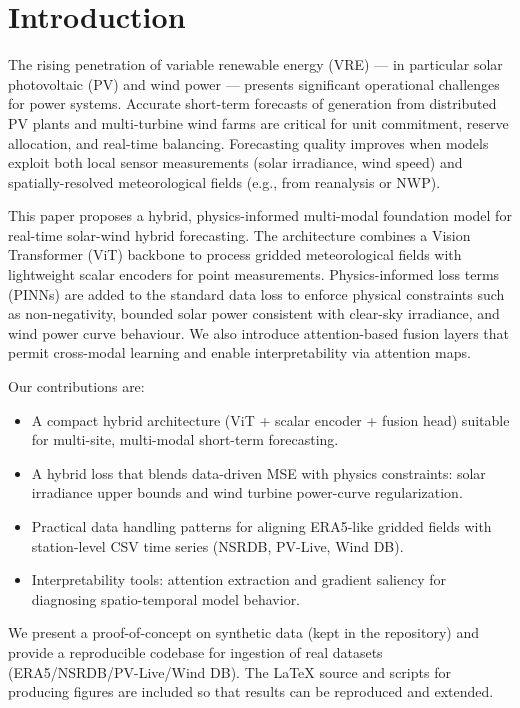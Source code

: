 \section*{Introduction}

The rising penetration of variable renewable energy (VRE) — in particular solar photovoltaic (PV) and wind power — presents significant operational challenges for power systems. Accurate short-term forecasts of generation from distributed PV plants and multi-turbine wind farms are critical for unit commitment, reserve allocation, and real-time balancing. Forecasting quality improves when models exploit both local sensor measurements (solar irradiance, wind speed) and spatially-resolved meteorological fields (e.g., from reanalysis or NWP).

This paper proposes a hybrid, physics-informed multi-modal foundation model for real-time solar-wind hybrid forecasting. The architecture combines a Vision Transformer (ViT) backbone to process gridded meteorological fields with lightweight scalar encoders for point measurements. Physics-informed loss terms (PINNs) are added to the standard data loss to enforce physical constraints such as non-negativity, bounded solar power consistent with clear-sky irradiance, and wind power curve behaviour. We also introduce attention-based fusion layers that permit cross-modal learning and enable interpretability via attention maps.

Our contributions are:
\begin{itemize}
	\item A compact hybrid architecture (ViT + scalar encoder + fusion head) suitable for multi-site, multi-modal short-term forecasting.
	\item A hybrid loss that blends data-driven MSE with physics constraints: solar irradiance upper bounds and wind turbine power-curve regularization.
	\item Practical data handling patterns for aligning ERA5-like gridded fields with station-level CSV time series (NSRDB, PV-Live, Wind DB).
	\item Interpretability tools: attention extraction and gradient saliency for diagnosing spatio-temporal model behavior.
\end{itemize}

We present a proof-of-concept on synthetic data (kept in the repository) and provide a reproducible codebase for ingestion of real datasets (ERA5/NSRDB/PV-Live/Wind DB). The LaTeX source and scripts for producing figures are included so that results can be reproduced and extended.
